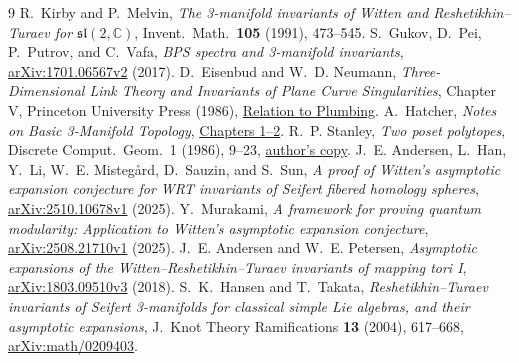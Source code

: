 \documentclass[11pt]{article}
\begin{document}
\begin{thebibliography}{9}
 R.~Kirby and P.~Melvin,
  \emph{The 3-manifold invariants of Witten and Reshetikhin--Turaev for \(\mathfrak{sl}(2,\mathbb C)\)},
  Invent.~Math.~\textbf{105} (1991), 473--545.
 S.~Gukov, D.~Pei, P.~Putrov, and C.~Vafa,
  \emph{BPS spectra and 3-manifold invariants},
  \href{https://arxiv.org/abs/1701.06567}{arXiv:1701.06567v2} (2017).
 D.~Eisenbud and W.~D. Neumann,
  \emph{Three-Dimensional Link Theory and Invariants of Plane Curve Singularities},
  Chapter V, Princeton University Press (1986),
  \href{https://doi.org/10.1515/9781400881925-011}{Relation to Plumbing}.
 A.~Hatcher, \emph{Notes on Basic 3-Manifold Topology},
  \href{https://pi.math.cornell.edu/~hatcher/3M/3M.pdf}{Chapters 1--2}.
 R.~P. Stanley, \emph{Two poset polytopes},
  Discrete Comput.\ Geom.\ 1 (1986), 9--23,
  \href{https://www-math.mit.edu/~rstan/pubs/pubfiles/66.pdf}{author's copy}.
 J.~E. Andersen, L.~Han, Y.~Li, W.~E. Misteg\aa rd, D.~Sauzin, and S.~Sun,
  \emph{A proof of Witten's asymptotic expansion conjecture for WRT invariants of Seifert fibered homology spheres},
  \href{https://arxiv.org/abs/2510.10678v1}{arXiv:2510.10678v1} (2025).
 Y.~Murakami,
  \emph{A framework for proving quantum modularity: Application to Witten's asymptotic expansion conjecture},
  \href{https://arxiv.org/pdf/2508.21710v1#page=2}{arXiv:2508.21710v1} (2025).
 J.~E. Andersen and W.~E. Petersen,
  \emph{Asymptotic expansions of the Witten--Reshetikhin--Turaev invariants of mapping tori I},
  \href{https://arxiv.org/abs/1803.09510}{arXiv:1803.09510v3} (2018).
 S.~K.~Hansen and T.~Takata,
  \emph{Reshetikhin--Turaev invariants of Seifert 3-manifolds for classical simple Lie algebras, and their asymptotic expansions},
  J.~Knot Theory Ramifications \textbf{13} (2004), 617--668,
  \href{https://arxiv.org/abs/math/0209403}{arXiv:math/0209403}.
\end{thebibliography}
\end{document}
